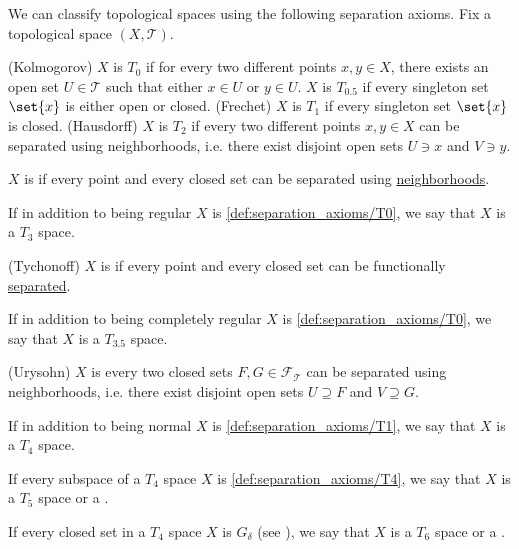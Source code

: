 \begin{definition}\label{def:separation_axioms}
  We can classify topological spaces using the following separation axioms. Fix a topological space \( (X, \mathcal{T}) \).

  \begin{thmenum}
     (Kolmogorov) \( X \) is \( T_0 \) if for every two different points \( x, y \in X \), there exists an open set \( U \in \mathcal{T} \) such that either \( x \in U \) or \( y \in U \).
     \( X \) is \( T_{0.5} \) if every singleton set \( \set{ x } \) is either open or closed.
     (Frechet) \( X \) is \( T_1 \) if every singleton set \( \set{ x } \) is closed.
     (Hausdorff) \( X \) is \( T_2 \) if every two different points \( x, y \in X \) can be separated using neighborhoods, i.e. there exist disjoint open sets \( U \ni x \) and \( V \ni y \).

     \( X \) is  if every point and every closed set can be separated using \hyperref[def:topological_space_separation]{neighborhoods}.

    If in addition to being regular \( X \) is \ref{def:separation_axioms/T0}, we say that \( X \) is a \( T_3 \) space.

     (Tychonoff) \( X \) is  if every point and every closed set can be functionally \hyperref[def:topological_space_separation]{separated}.

    If in addition to being completely regular \( X \) is \ref{def:separation_axioms/T0}, we say that \( X \) is a \( T_{3.5} \) space.

    (Urysohn) \( X \) is  every two closed sets \( F, G \in \mathcal{F}_{\mathcal{T}} \) can be separated using neighborhoods, i.e. there exist disjoint open sets \( U \supseteq F \) and \( V \supseteq G \).

    If in addition to being normal \( X \) is \ref{def:separation_axioms/T1}, we say that \( X \) is a \( T_4 \) space.

     If every subspace of a \( T_4 \) space \( X \) is \ref{def:separation_axioms/T4}, we say that \( X \) is a \( T_5 \) space or a .

     If every closed set in a \( T_4 \) space \( X \) is \( G_\delta \) (see ), we say that \( X \) is a \( T_6 \) space or a .
  \end{thmenum}
\end{definition}


